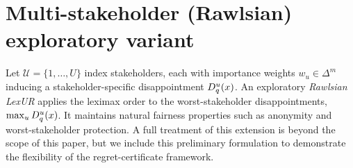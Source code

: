 \section{Multi-stakeholder (Rawlsian) exploratory variant}
\label{app:rawlsian}

Let $\mathcal U=\{1,\dots,U\}$ index stakeholders, each with importance weights
$w_u\in\Delta^m$ inducing a stakeholder-specific disappointment $D_q^u(x)$.
An exploratory \emph{Rawlsian LexUR} applies the leximax order to the worst-stakeholder
disappointments, $\max_{u}D_{q}^u(x)$.
It maintains natural fairness properties such as anonymity and worst-stakeholder protection. A full treatment of this extension is beyond the scope of this paper, but we include this preliminary formulation to demonstrate the flexibility of the regret-certificate framework.
